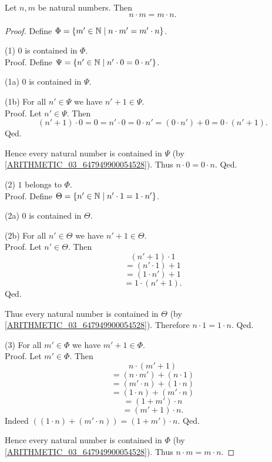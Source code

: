 \documentclass[10pt]{article}
\begin{document}
  \begin{forthel}
    \begin{proposition}
      Let $n, m$ be natural numbers.
      Then \[ n \cdot m = m \cdot n. \]
    \end{proposition}
    \begin{proof}
      Define $\Phi = \{ m' \in \mathbb{N} \mid n \cdot m' = m' \cdot n \}$.

      (1) $0$ is contained in $\Phi$. \\
      Proof.
        Define $\Psi = \{ n' \in \mathbb{N} \mid n' \cdot 0 = 0 \cdot n' \}$.

        (1a) $0$ is contained in $\Psi$.

        (1b) For all $n' \in \Psi$ we have $n' + 1 \in \Psi$. \\
        Proof.
          Let $n' \in \Psi$.
          Then
          \[ (n' + 1) \cdot 0
            = 0
            = n' \cdot 0
            = 0 \cdot n'
            = (0 \cdot n') + 0
            = 0 \cdot (n' + 1). \]
        Qed.

        Hence every natural number is contained in $\Psi$ (by \cref{ARITHMETIC_03_647949900054528}).
        Thus $n \cdot 0 = 0 \cdot n$.
      Qed.

      (2) $1$ belongs to $\Phi$. \\
      Proof.
        Define $\Theta = \{ n' \in \mathbb{N} \mid n' \cdot 1 = 1 \cdot n' \}$.

        (2a) $0$ is contained in $\Theta$.

        (2b) For all $n' \in \Theta$ we have $n' + 1 \in \Theta$. \\
        Proof.
          Let $n' \in \Theta$.
          Then
          \[  (n' + 1) \cdot 1        \]
          \[    = (n' \cdot 1) + 1    \]
          \[    = (1 \cdot n') + 1    \]
          \[    = 1 \cdot (n' + 1).   \]
        Qed.

        Thus every natural number is contained in $\Theta$ (by \cref{ARITHMETIC_03_647949900054528}).
        Therefore $n \cdot 1 = 1 \cdot n$.
      Qed.

      (3) For all $m' \in \Phi$ we have $m' + 1 \in \Phi$. \\
      Proof.
        Let $m' \in \Phi$.
        Then
        \[  n \cdot (m' + 1)                \]
        \[    = (n \cdot m') + (n \cdot 1)  \]
        \[    = (m' \cdot n) + (1 \cdot n)  \]
        \[    = (1 \cdot n) + (m' \cdot n)  \]
        \[    = (1 + m') \cdot n            \]
        \[    = (m' + 1) \cdot n.           \]
        Indeed $((1 \cdot n) + (m' \cdot n)) = (1 + m') \cdot n$. %
      Qed.

      Hence every natural number is contained in $\Phi$ (by \cref{ARITHMETIC_03_647949900054528}).
      Thus $n \cdot m = m \cdot n$.
    \end{proof}
  \end{forthel}
\end{document}
